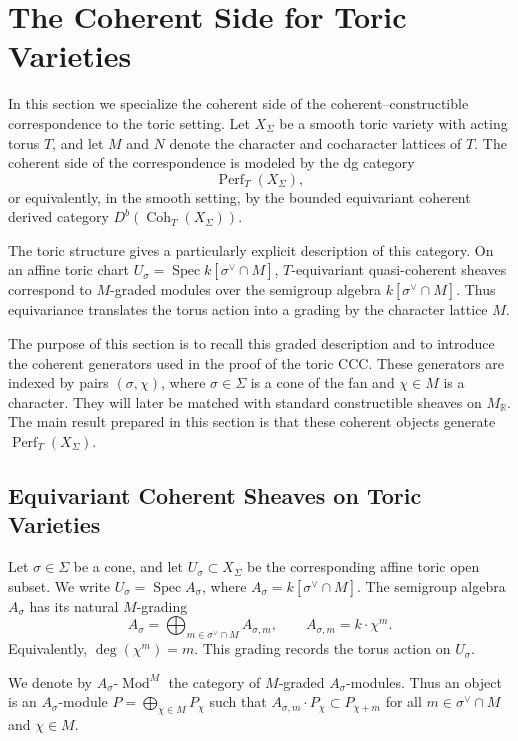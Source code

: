\section{The Coherent Side for Toric Varieties}

In this section we specialize the coherent side of the
coherent--constructible correspondence to the toric setting.  Let
\(X_\Sigma\) be a smooth toric variety with acting torus \(T\), and let
\(M\) and \(N\) denote the character and cocharacter lattices of \(T\).
The coherent side of the correspondence is modeled by the dg category
\[
\operatorname{Perf}_T(X_\Sigma),
\]
or equivalently, in the smooth setting, by the bounded equivariant
coherent derived category \(D^b(\operatorname{Coh}_T(X_\Sigma))\).

The toric structure gives a particularly explicit description of this
category.  On an affine toric chart
\(U_\sigma=\operatorname{Spec}k[\sigma^\vee\cap M]\), \(T\)-equivariant
quasi-coherent sheaves correspond to \(M\)-graded modules over the
semigroup algebra \(k[\sigma^\vee\cap M]\).  Thus equivariance translates
the torus action into a grading by the character lattice \(M\).

The purpose of this section is to recall this graded description and to
introduce the coherent generators used in the proof of the toric CCC.
These generators are indexed by pairs \((\sigma,\chi)\), where
\(\sigma\in\Sigma\) is a cone of the fan and \(\chi\in M\) is a
character.  They will later be matched with standard constructible
sheaves on \(M_{\mathbb R}\).  The main result prepared in this section
is that these coherent objects generate
\(\operatorname{Perf}_T(X_\Sigma)\).


\subsection{Equivariant Coherent Sheaves on Toric Varieties}

Let \(\sigma\in\Sigma\) be a cone, and let
\(U_\sigma\subset X_\Sigma\) be the corresponding affine toric open
subset.  We write \(U_\sigma=\operatorname{Spec}A_\sigma\), where
\(A_\sigma=k[\sigma^\vee\cap M]\).  The semigroup algebra \(A_\sigma\)
has its natural \(M\)-grading
\[
A_\sigma=\bigoplus_{m\in\sigma^\vee\cap M}A_{\sigma,m},
\qquad
A_{\sigma,m}=k\cdot\chi^m.
\]
Equivalently, \(\deg(\chi^m)=m\).  This grading records the torus action
on \(U_\sigma\).

We denote by \(A_\sigma\text{-}\operatorname{Mod}^M\) the category of
\(M\)-graded \(A_\sigma\)-modules.  Thus an object is an
\(A_\sigma\)-module \(P=\bigoplus_{\chi\in M}P_\chi\) such that
\(A_{\sigma,m}\cdot P_\chi\subset P_{\chi+m}\) for all
\(m\in\sigma^\vee\cap M\) and \(\chi\in M\).

